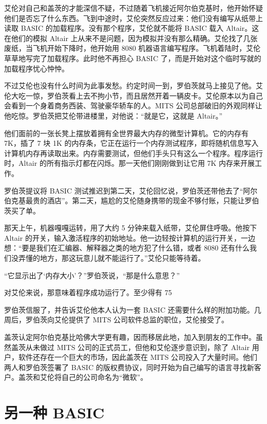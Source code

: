 \documentclass[12pt,UTF8]{ctexbook}
\begin{document}
艾伦对自己和盖茨的才能深信不疑，不过随着飞机接近阿尔伯克基时，他开始怀疑他们是否忘了什么东西。飞到中途时，艾伦突然反应过来：他们没有编写从纸带上读取 BASIC 的加载程序。没有那个程序，艾伦就不能将 BASIC 载入 Altair。这在他们的模拟 Altair 上从来不是问题，因为模拟并没有那么精确。艾伦找了几张废纸，当飞机开始下降时，他开始用 8080 机器语言编写程序。飞机着陆时，艾伦草草地写完了加载程序。此时他不再担心 BASIC 了，而是开始对这个临时写就的加载程序忧心忡忡。

不过艾伦也没有什么时间为此事发愁。约定时间一到，罗伯茨就马上接见了他。艾伦大吃一惊，罗伯茨看上去不拘小节，而且居然开着一辆皮卡。艾伦原本以为自己会看到一个身着商务西装、驾驶豪华轿车的人。MITS 公司总部破旧的外观同样让他吃惊。罗伯茨把艾伦带进楼里，对他说：“就是它，这就是 Altair。”

他们面前的一张长凳上摆放着拥有全世界最大内存的微型计算机。它的内存有 7K，插了 7 块 1K 的内存条，它正在运行一个内存测试程序，即将随机信息写入计算机内存再读取出来。内存需要测试，但他们手头只有这么一个程序。程序运行时，Altair 的所有指示灯都在闪烁。那一天他们刚刚做到让它用 7K 内存来开展工作。

罗伯茨提议将 BASIC 测试推迟到第二天，艾伦回忆说，罗伯茨还带他去了“阿尔伯克基最贵的酒店”。第二天，尴尬的艾伦随身携带的现金不够付账，只能让罗伯茨买了单。

那天上午，机器嘎嘎运转，用了大约 5 分钟来载入纸带，艾伦屏住呼吸。他按下 Altair 的开关，输入激活程序的初始地址。他一边轻按计算机的运行开关，一边想：“要是我们在汇编器、解释器之类的地方犯了什么错，或者 8080 还有什么我们没弄懂的地方，那这玩意儿就不能运行了。”艾伦只能等待着。

“它显示出了‘内存大小’？”罗伯茨说，“那是什么意思？”

对艾伦来说，那意味着程序成功运行了。至少得有 75%

罗伯茨信服了，并告诉艾伦他本人认为一套 BASIC 还需要什么样的附加功能。几周后，罗伯茨向艾伦提供了 MITS 公司软件总监的职位，艾伦接受了。

盖茨认定阿尔伯克基比哈佛大学更有趣，因而移居此地，加入到朋友的工作中。虽然盖茨从未做过 MITS 公司的正式员工，但他和艾伦逐步意识到，除了 Altair 用户，软件还存在一个巨大的市场，因此盖茨在 MITS 公司投入了大量时间。他们两人和罗伯茨签署了 BASIC 的版权费协议，同时开始为自己编写的语言寻找新客户。盖茨和艾伦将自己的公司命名为“微软”。





\section{另一种 BASIC}
\end{document}
